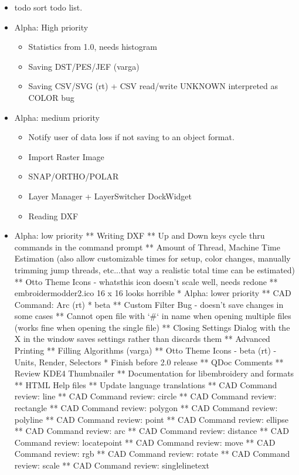 \begin{itemize}
\item todo sort todo list.
\item Alpha: High priority
\begin{itemize}
\item Statistics from 1.0, needs histogram
\item Saving DST/PES/JEF (varga)
\item Saving CSV/SVG (rt) + CSV read/write UNKNOWN interpreted as COLOR bug
\end{itemize}
\item Alpha: medium priority
\begin{itemize}
\item Notify user of data loss if not saving to an object format.
\item Import Raster Image
\item SNAP/ORTHO/POLAR
\item Layer Manager + LayerSwitcher DockWidget
\item Reading DXF
\end{itemize}
\item Alpha: low priority
** Writing DXF
** Up and Down keys cycle thru commands in the command prompt
** Amount of Thread, Machine Time Estimation (also allow customizable times for setup, color changes, manually
trimming jump threads, etc...that way a realistic total time can be estimated)
** Otto Theme Icons - whatsthis icon doesn't scale well, needs redone
** embroidermodder2.ico 16 x 16 looks horrible
* Alpha: lower priority
** CAD Command: Arc (rt)
* beta
** Custom Filter Bug - doesn't save changes in some cases
** Cannot open file with `#` in name when opening multiple files (works fine when opening the single file)
** Closing Settings Dialog with the X in the window saves settings rather than discards them
** Advanced Printing
** Filling Algorithms (varga)
** Otto Theme Icons - beta (rt) - Units, Render, Selectors
* Finish before 2.0 release
** QDoc Comments
** Review KDE4 Thumbnailer
** Documentation for libembroidery and formats
** HTML Help files
** Update language translations
** CAD Command review: line
** CAD Command review: circle
** CAD Command review: rectangle
** CAD Command review: polygon
** CAD Command review: polyline
** CAD Command review: point
** CAD Command review: ellipse
** CAD Command review: arc
** CAD Command review: distance
** CAD Command review: locatepoint
** CAD Command review: move
** CAD Command review: rgb
** CAD Command review: rotate
** CAD Command review: scale
** CAD Command review: singlelinetext

\end{itemize}
